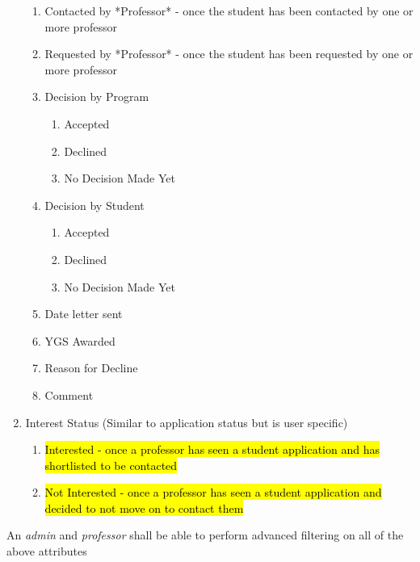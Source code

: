 \documentclass[fontsize=12pt,paper=letter,twoside]{scrartcl}
\begin{document}
\begin{mylist}
\begin{enumerate}
\begin{enumerate}
\item Contacted by *Professor* - once the student has been contacted by one or more professor
\item Requested by *Professor* - once the student has been requested by one or more professor
\item Decision by Program
\begin{enumerate} 
\item Accepted
\item Declined
\item No Decision Made Yet
\end{enumerate}
\item Decision by Student
\begin{enumerate}
\item Accepted
\item Declined
\item No Decision Made Yet
\end{enumerate}
\item Date letter sent
\item YGS Awarded
\item Reason for Decline
\item Comment
\end{enumerate}
\item Interest Status (Similar to application status but is user specific)
\begin{enumerate}
\item \hl{Interested - once a professor has seen a student application and has shortlisted to be contacted}
\item \hl{Not Interested - once a professor has seen a student application and decided to not move on to contact them}
\end{enumerate}
\end{enumerate}
\item An \emph{admin} and \emph{professor} shall be able to perform advanced filtering on all of the above attributes
\end{mylist}
\end{document}

